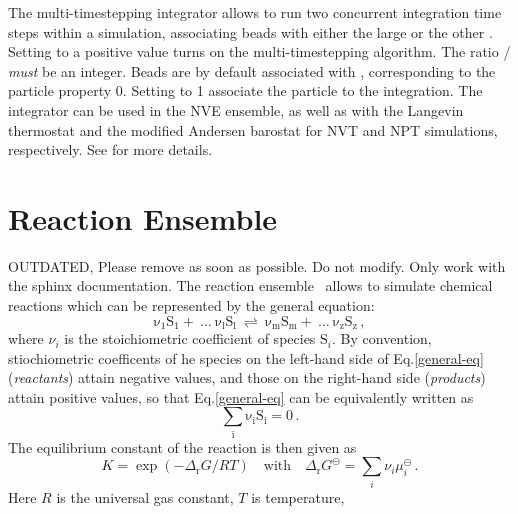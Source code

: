 The multi-timestepping integrator allows to run two concurrent integration time
steps within a simulation, associating beads with either the large
 or the other .  Setting
 to a positive value turns on the multi-timestepping
algorithm.  The ratio / \emph{must} be
an integer.  Beads are by default associated with ,
corresponding to the particle property  0.  Setting
 to 1 associate the particle to the
 integration.  The integrator can be used in the NVE
ensemble, as well as with the Langevin thermostat and the modified Andersen
barostat for NVT and NPT simulations, respectively.  See \cite{bereau15} for
more details.

\section{Reaction Ensemble}
OUTDATED, Please remove as soon as possible. Do not modify. Only work with the sphinx documentation.
The reaction ensemble~\cite{smith94a} allows to simulate chemical reactions which can be represented by the general equation:
\begin{equation}
	\mathrm{\nu_1 S_1 +\ \dots\  \nu_l S_l\ \rightleftharpoons\ \nu_m S_m +\ \dots\ \nu_z S_z } \,,
	\label{general-eq}
\end{equation}
where $\nu_i$ is the stoichiometric coefficient of species $\mathrm{S}_i$.  By
convention, stiochiometric coefficents of he species on the left-hand side of
Eq.\ref{general-eq} (\emph{reactants}) attain negative values, and those on the
right-hand side (\emph{products}) attain positive values, so that
Eq.\ref{general-eq} can be equivalently written as
\begin{equation}
	\mathrm{\sum_i \nu_i S_i = 0} \,.
	\label{general-eq-sum}
\end{equation}
The equilibrium constant of the reaction is then given as
\begin{equation}
	K = \exp(-\Delta_{\mathrm{r}}G / RT)
	\quad\text{with}\quad
	\Delta_{\mathrm{r}}G^{\ominus} = \sum_i \nu_i \mu_i^{\ominus}\,.
	\label{Keq}
\end{equation}
Here $R$ is the universal gas constant, $T$ is temperature,
